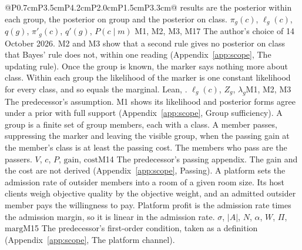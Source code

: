 \begin{longtable}{@{}P{0.7cm}P{3.5cm}P{4.2cm}P{2.0cm}P{1.5cm}P{3.3cm}@{}}
{  results are the posterior within each group, the posterior on group and
  the posterior on class.}
  {$\pi_g(c)$, $\ell_g(c)$, $q(g)$, $\pi'_g(c)$, $q'(g)$, $P(c\mid m)$}
  {M1, M2, M3, M17}
  {The author's choice of 14 October 2026. M2 and M3 show that a second rule
  gives no posterior on class that Bayes' rule does not, within one reading
  (Appendix~\ref{app:scope}, The updating rule).}
  {Once the group is known, the marker says nothing more about class. Within
  each group the likelihood of the marker is one constant likelihood for
  every class, and so equals the marginal.
  Lean, .}
  {$\ell_g(c)$, $Z_g$, $\lambda_g$}{M1, M2, M3}
  {The predecessor's assumption. M1 shows its likelihood and posterior forms
  agree under a prior with full support (Appendix~\ref{app:scope}, Group
  sufficiency).}
  {A group is a finite set of group members, each with a class. A member
  passes, suppressing the marker and leaving the visible group, when the
  passing gain at the member's class is at least the passing cost. The
  members who pass are the passers.}
  {$V$, $c$, $P$, $\mathrm{gain}$, $\mathrm{cost}$}{M14}
  {The predecessor's passing appendix. The gain and the cost are not derived
  (Appendix~\ref{app:scope}, Passing).}
  {A platform sets the admission rate of outsider members into a room of a
  given room size. Its host clients weigh objective quality by the objective
  weight, and an admitted outsider member pays the willingness to pay.
  Platform profit is the admission rate times the admission margin, so it is
  linear in the admission rate.}
  {$\sigma$, $|A|$, $N$, $\alpha$, $W$, $\Pi$, $\mathrm{marg}$}{M15}
  {The predecessor's first-order condition, taken as a definition
  (Appendix~\ref{app:scope}, The platform channel).}
\end{longtable}
